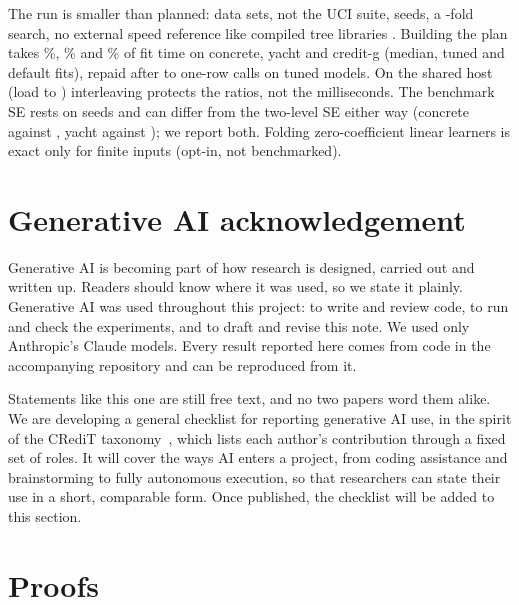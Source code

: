 \documentclass{article}
\begin{document}
The run is smaller than planned: \nDataSets{} data sets, not the UCI suite, \nConcreteSeeds{} seeds, a \nCVFolds-fold search, no external speed reference like compiled tree libraries \citep{cho2018treelite,nakandala2020hummingbird}. Building the plan takes \nConcretePlanOverFit\%, \nYachtPlanOverFit\% and \nCreditGPlanOverFit\% of fit time on concrete, yacht and credit-g (median, tuned and default fits), repaid after \nPayMin{} to \nPayMax{} one-row calls on tuned models. On the shared host (load \nLoadMin{} to \nLoadMax) interleaving protects the ratios, not the milliseconds. The benchmark SE rests on \nConcreteSeeds{} seeds and can differ from the two-level SE either way (concrete \nConcreteOnePristineSE{} against \nConcreteOnePristineBootSE, yacht \nYachtOnePristineSE{} against \nYachtOnePristineBootSE); we report both. Folding zero-coefficient linear learners is exact only for finite inputs (opt-in, not benchmarked).

\section*{Generative AI acknowledgement}
Generative AI is becoming part of how research is designed, carried out and written up. Readers should know where it was used, so we state it plainly. Generative AI was used throughout this project: to write and review code, to run and check the experiments, and to draft and revise this note. We used only Anthropic's Claude models. Every result reported here comes from code in the accompanying repository and can be reproduced from it.

Statements like this one are still free text, and no two papers word them alike. We are developing a general checklist for reporting generative AI use, in the spirit of the CRediT taxonomy~\citep{brand2015credit}, which lists each author's contribution through a fixed set of roles. It will cover the ways AI enters a project, from coding assistance and brainstorming to fully autonomous execution, so that researchers can state their use in a short, comparable form. Once published, the checklist will be added to this section.




\appendix

\section{Proofs}
\label{app:proofs}
\end{document}
